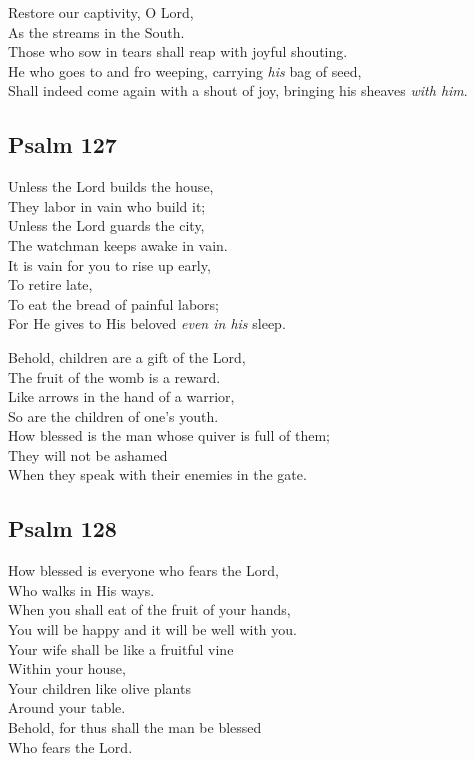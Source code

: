 \documentclass[14pt]{extbook}
\begin{document}
Restore our captivity, O Lord,\\
As the streams in the South.\\
Those who sow in tears shall reap with joyful shouting.\\
He who goes to and fro weeping, carrying \emph{his} bag of seed,\\
Shall indeed come again with a shout of joy, bringing his sheaves
\emph{with him}.

\hypertarget{psalm-127}{%
\subsection{Psalm 127}\label{psalm-127}}

Unless the Lord builds the house,\\
They labor in vain who build it;\\
Unless the Lord guards the city,\\
The watchman keeps awake in vain.\\
It is vain for you to rise up early,\\
To retire late,\\
To eat the bread of painful labors;\\
For He gives to His beloved \emph{even in his} sleep.

Behold, children are a gift of the Lord,\\
The fruit of the womb is a reward.\\
Like arrows in the hand of a warrior,\\
So are the children of one's youth.\\
How blessed is the man whose quiver is full of them;\\
They will not be ashamed\\
When they speak with their enemies in the gate.

\newpage
\hypertarget{psalm-128}{%
\subsection{Psalm 128}\label{psalm-128}}

How blessed is everyone who fears the Lord,\\
Who walks in His ways.\\
When you shall eat of the fruit of your hands,\\
You will be happy and it will be well with you.\\
Your wife shall be like a fruitful vine\\
Within your house,\\
Your children like olive plants\\
Around your table.\\
Behold, for thus shall the man be blessed\\
Who fears the Lord.
\end{document}
